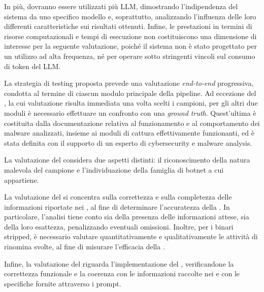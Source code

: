 
In più, dovranno essere utilizzati più LLM, dimostrando l'indipendenza del sistema da uno specifico modello e, soprattutto, analizzando l'influenza delle loro differenti caratteristiche sui risultati ottenuti. Infine, le prestazioni in termini di risorse computazionali e tempi di esecuzione non costituiscono una dimensione di interesse per la seguente valutazione, poiché il sistema non è stato progettato per un utilizzo ad alta frequenza, né per operare sotto stringenti vincoli sul consumo di token del LLM.

La strategia di testing proposta prevede una valutazione \emph{end-to-end} progressiva, condotta al termine di ciascun modulo principale della pipeline. Ad eccezione del \classifier{}, la cui valutazione risulta immediata una volta scelti i campioni, per gli altri due moduli è necessario effettuare un confronto con una \emph{ground truth}. Quest'ultima è costituita dalla documentazione relativa al funzionamento e al comportamento dei malware analizzati, insieme ai moduli di cattura effettivamente funzionanti, ed è stata definita con il supporto di un esperto di cybersecurity e malware analysis.


La valutazione del \classifier{} considera due aspetti distinti: il riconoscimento della natura malevola del campione e l'individuazione della famiglia di botnet a cui appartiene. %


La valutazione del \sreagent{} si concentra sulla correttezza e sulla completezza delle informazioni riportate nei \report{}, al fine di determinare l'accuratezza della \reversing{}. In particolare, l'analisi tiene conto sia della presenza delle informazioni attese, sia della loro esattezza, penalizzando eventuali omissioni. Inoltre, per i binari stripped, è necessario valutare quantitativamente e qualitativamente le attività di rinomina svolte, al fine di misurare l'efficacia della \renaming{}.

Infine, la valutazione del \codeagent{} riguarda l'implementazione del \capture{}, verificandone la correttezza funzionale e la coerenza con le informazioni raccolte nei \report{} e con le specifiche fornite attraverso i prompt.

